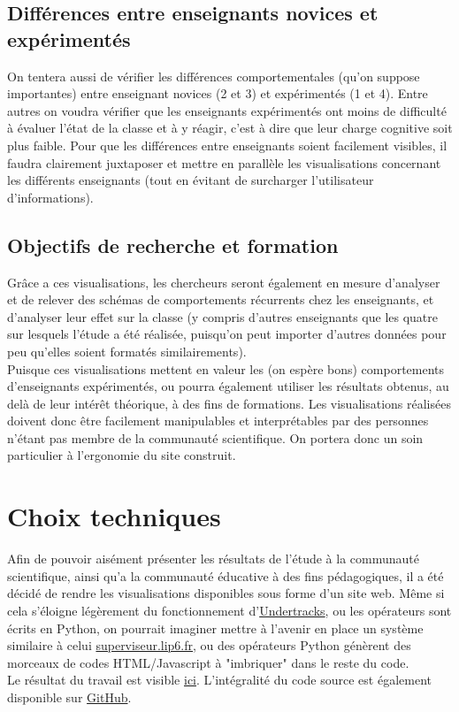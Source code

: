 \documentclass{article}
\begin{document}
\subsection{Différences entre enseignants novices et expérimentés}
On tentera aussi de vérifier les différences comportementales (qu'on suppose importantes) entre enseignant novices (2 et 3) et expérimentés (1 et 4). Entre autres on voudra vérifier que les enseignants expérimentés ont moins de difficulté à évaluer l'état de la classe et à y réagir, c'est à dire que leur charge cognitive soit plus faible. Pour que les différences entre enseignants soient facilement visibles, il faudra clairement juxtaposer et mettre en parallèle les visualisations concernant les différents enseignants (tout en évitant de surcharger l'utilisateur d'informations).

\subsection{Objectifs de recherche et formation}
Grâce a ces visualisations, les chercheurs seront également en mesure d'analyser et de relever des schémas de comportements récurrents chez les enseignants, et d'analyser leur effet sur la classe (y compris d'autres enseignants que les quatre sur lesquels l'étude a été réalisée, puisqu'on peut importer d'autres données pour peu qu'elles soient formatés similairements).\\
Puisque ces visualisations mettent en valeur les (on espère bons) comportements d'enseignants expérimentés, ou pourra également utiliser les résultats obtenus, au delà de leur intérêt théorique, à des fins de formations. Les visualisations réalisées doivent donc être facilement manipulables et interprétables par des personnes n'étant pas membre de la communauté scientifique. On portera donc un soin particulier à l'ergonomie du site construit.

\section{Choix techniques}
Afin de pouvoir aisément présenter les résultats de l'étude à la communauté scientifique, ainsi qu'a la communauté éducative à des fins pédagogiques, il a été décidé de rendre les visualisations disponibles sous forme d'un site web. Même si cela s'éloigne légèrement du fonctionnement d'\href{https://undertracks.imag.fr}{Undertracks}, ou les opérateurs sont écrits en Python, on pourrait imaginer mettre à l'avenir en place un système similaire à celui \href{http://superviseur.lip6.fr}{superviseur.lip6.fr}, ou des opérateurs Python génèrent des morceaux de codes HTML/Javascript à "imbriquer" dans le reste du code.\\
Le résultat du travail est visible \href{https://vertmo.github.io/SuperViseur/}{ici}. L'intégralité du code source est également disponible sur \href{https://github.com/Vertmo/SuperViseur}{GitHub}.
\end{document}

